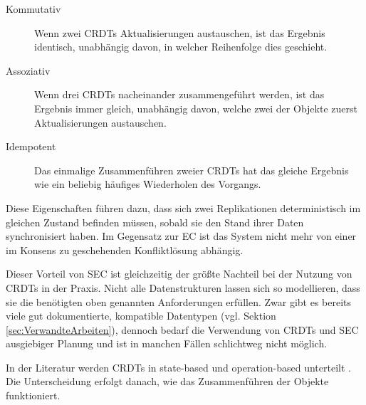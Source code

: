 \documentclass[a4paper, 12pt]{scrreprt}
\begin{document}
\begin{description}
	\label{sec:kommuassoidem}
	\item[Kommutativ] Wenn zwei \acp{CRDT} Aktualisierungen austauschen, ist das Ergebnis identisch, unabhängig davon, in welcher Reihenfolge dies geschieht.%
	\item[Assoziativ] Wenn drei \acp{CRDT} nacheinander zusammengeführt werden, ist das Ergebnis immer gleich, unabhängig davon, welche zwei der Objekte zuerst Aktualisierungen austauschen.%
	\item[Idempotent] Das einmalige Zusammenführen zweier \acp{CRDT} hat das gleiche Ergebnis wie ein beliebig häufiges Wiederholen des Vorgangs.%
\end{description}

Diese Eigenschaften führen dazu, dass sich zwei Replikationen deterministisch im gleichen Zustand befinden müssen, sobald sie den Stand ihrer Daten synchronisiert haben. Im Gegensatz zur \ac{EC} ist das System nicht mehr von einer im Konsens zu geschehenden Konfliktlösung abhängig. 

Dieser Vorteil von \ac{SEC} ist gleichzeitig der größte Nachteil bei der Nutzung von \acp{CRDT} in der Praxis. Nicht alle Datenstrukturen lassen sich so modellieren, dass sie die benötigten oben genannten Anforderungen erfüllen. Zwar gibt es bereits viele gut dokumentierte, kompatible Datentypen (vgl. Sektion \ref{sec:VerwandteArbeiten}), dennoch bedarf die Verwendung von \acp{CRDT} und \ac{SEC} ausgiebiger Planung und ist in manchen Fällen schlichtweg nicht möglich.

In der Literatur werden \acp{CRDT} in state-based und operation-based unterteilt \autocite[S. 10]{ArticleOptimisticReplication}. Die Unterscheidung erfolgt danach, wie das Zusammenführen der Objekte funktioniert.
\end{document}
